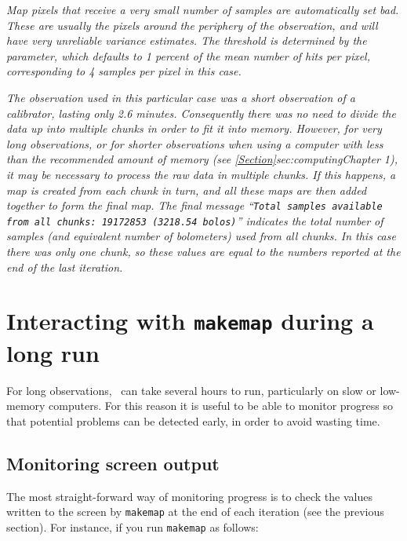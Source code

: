 \begin{terminalv}
\emph{Map pixels that receive a very small number of samples are automatically
set bad. These are usually the pixels around the periphery of the
observation, and will have very unreliable variance estimates. The
threshold is determined by the  parameter,
which defaults to 1 percent of the mean number of hits per pixel,
corresponding to 4 samples per pixel in this case.}

\emph{The observation used in this particular case was a short
observation of a calibrator, lasting only 2.6 minutes. Consequently there
was no need to divide the data up into multiple chunks in order to fit it
into memory.  However, for very long observations, or for shorter
observations when using a computer with less than the recommended amount
of memory (see \cref{Section}{sec:computing}{Chapter 1}), it may be
necessary to process the raw data in multiple chunks. If this happens, a
map is created from each chunk in turn, and all these maps are then added
together to form the final map.  The final message ``\texttt{Total
samples available from all chunks: 19172853 (3218.54 bolos)}'' indicates
the total number of samples (and equivalent number of bolometers) used
from all chunks. In this case there was only one chunk, so these values
are equal to the numbers reported at the end of the last iteration.}

\section{Interacting with \texttt{makemap} during a long run}
For long observations, \makemap\ can take several hours to run,
particularly on slow or low-memory computers. For this reason it is
useful to be able to monitor progress so that potential problems can be
detected early, in order to avoid wasting time.

\subsection{Monitoring screen output}
The most straight-forward way of monitoring progress is to check the
values written to the screen by \texttt{makemap} at the end of each iteration (see
the previous section). For instance, if you run \texttt{makemap} as follows:

\begin{terminalv}
\end{terminalv}


\end{terminalv}
